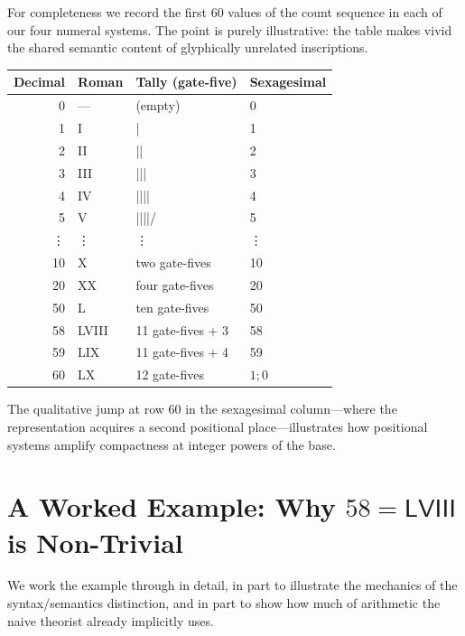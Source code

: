 \documentclass[12pt]{article}
\theoremstyle{definition}
\theoremstyle{remark}
\begin{document}
For completeness we record the first 60 values of the count sequence in
each of our four numeral systems. The point is purely illustrative: the
table makes vivid the shared semantic content of glyphically unrelated
inscriptions.

\begin{center}
\renewcommand{\arraystretch}{1.05}
\begin{tabular}{r|l|l|l}
\textbf{Decimal} & \textbf{Roman} & \textbf{Tally (gate-five)} & \textbf{Sexagesimal} \\ \hline
0  & ---           & (empty)              & 0 \\
1  & I             & |                    & 1 \\
2  & II            & ||                   & 2 \\
3  & III           & |||                  & 3 \\
4  & IV            & ||||                 & 4 \\
5  & V             & ||||/                & 5 \\
\vdots & \vdots    & \vdots               & \vdots \\
10 & X             & two gate-fives       & 10 \\
20 & XX            & four gate-fives      & 20 \\
50 & L             & ten gate-fives       & 50 \\
58 & LVIII         & 11 gate-fives + 3    & 58 \\
59 & LIX           & 11 gate-fives + 4    & 59 \\
60 & LX            & 12 gate-fives        & $1{;}0$ \\
\end{tabular}
\end{center}

The qualitative jump at row 60 in the sexagesimal column---where the
representation acquires a second positional place---illustrates how
positional systems amplify compactness at integer powers of the base.

\section{A Worked Example: Why \texorpdfstring{$58 = \mathsf{LVIII}$}{58 = LVIII} is Non-Trivial}
\label{app:lviii-example}

We work the example through in detail, in part to illustrate the
mechanics of the syntax/semantics distinction, and in part to show how
much of arithmetic the naive theorist already implicitly uses.
\end{document}
